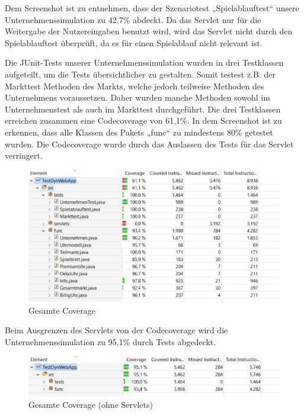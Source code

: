 Dem Screenshot ist zu entnehmen, dass der Szenariotest „Spielablauftest“ unsere Unternehmenssimulation zu 42,7\% abdeckt. Da das Servlet nur für die Weitergabe der Nutzereingaben benutzt wird, wird das Servlet nicht durch den Spielablauftest überprüft, da es für einen Spielablauf nicht relevant ist.   

Die JUnit-Tests unserer Unternehmenssimulation wurden in drei Testklassen aufgeteilt, um die Tests übersichtlicher zu gestalten. Somit testest z.B. der Markttest Methoden des Markts, welche jedoch teilweise Methoden des Unternehmens voraussetzen. Daher wurden manche Methoden sowohl im Unternehmenstest als auch im Markttest durchgeführt. Die drei Testklassen erreichen zusammen eine Codecoverage von 61,1\%. In dem Screenshot ist zu erkennen, dass alle Klassen des Pakets „func“ zu mindestens 80\% getestet wurden. Die Codecoverage wurde durch das Auslassen des Tests für das Servlet verringert. 

\begin{figure}[!h]
	\centering
	\includegraphics[scale=0.9]{img/bild2_tests.png} 
	\caption{Gesamte Coverage} \label{fig:abb32}
\end{figure}
\par
\par
\par
\par
\par
\par
Beim Ausgrenzen des Servlets von der Codecoverage wird die Unternehmenssimulation zu 95,1\% durch Tests abgedeckt. 

\begin{figure}[!h]
	\centering
	\includegraphics[scale=0.9]{img/bild3_tests.png} 
	\caption{Gesamte Coverage (ohne Servlets)} \label{fig:abb33}
\end{figure}







